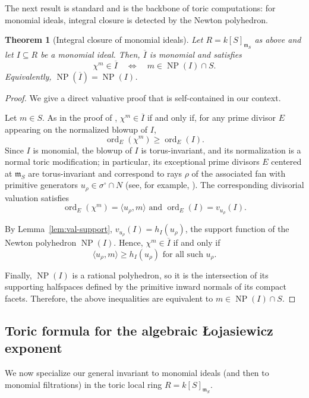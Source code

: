 \documentclass[12pt]{amsart}
\newcommand{\kk}{k}
\newcommand{\m}{\mathfrak m}
\newcommand{\ord}{\operatorname{\mathrm{ord}}}
\DeclareMathOperator{\NP}{NP}
\theoremstyle{plain}
\newtheorem{theorem}{Theorem}[section]
\theoremstyle{definition}
\numberwithin{equation}{section}
\begin{document}
The next result is standard and is the backbone of toric computations:
for monomial ideals, integral closure is detected by the Newton polyhedron.

\begin{theorem}[Integral closure of monomial ideals]\label{thm:int-closure-monomial}
	Let $R=\kk[S]_{\m_S}$ as above and let $I\subseteq R$ be a monomial ideal.
	Then, $\overline{I}$ is monomial and satisfies
	\[
	\chi^m\in \overline{I}\quad \Longleftrightarrow\quad m\in \NP(I)\cap S.
	\]
	Equivalently, $\NP(\overline{I})=\NP(I)$.
\end{theorem}

\begin{proof}
	We give a direct valuative proof that is self-contained in our context.
	
	Let $m\in S$. As in the proof of , $\chi^m\in\overline{I}$ if and only if, for any prime divisor $E$ appearing on the  normalized blowup of $I$, 
	\[
	\ord_E(\chi^m)\ge \ord_E(I).
	\]
	Since $I$ is monomial, the blowup of $I$ is torus-invariant, and its normalization is a normal toric modification; in particular, its exceptional prime divisors $E$ centered at $\m_S$ are torus-invariant and correspond to rays $\rho$ of the associated fan with primitive generators $u_\rho \in \sigma^\circ \cap N$ (see, for example, \cite{CLS}). The corresponding divisorial valuation satisfies 
	$$\ord_E(\chi^m) = \langle u_\rho, m\rangle \text{ and } \ord_E(I) = v_{u_\rho}(I).$$

By Lemma~\ref{lem:val-support}, $v_{u_\rho}(I) = h_I(u_\rho)$, the support function of the Newton polyhedron $\NP(I)$. Hence, $\chi^m \in \overline{I}$ if and only if 
$$\langle u_\rho, m\rangle \ge h_I(u_\rho) \text{ for all such } u_\rho.$$

Finally, $\NP(I)$ is a rational polyhedron, so it is the intersection of its supporting halfspaces defined by the primitive inward normals of its compact facets. Therefore, the above inequalities are equivalent to $m \in \NP(I) \cap S$.
\end{proof}

\subsection{Toric formula for the algebraic \L ojasiewicz exponent}

We now specialize our general invariant to monomial ideals (and then to monomial
filtrations) in the toric local ring $R=\kk[S]_{\m_S}$.
\end{document}
